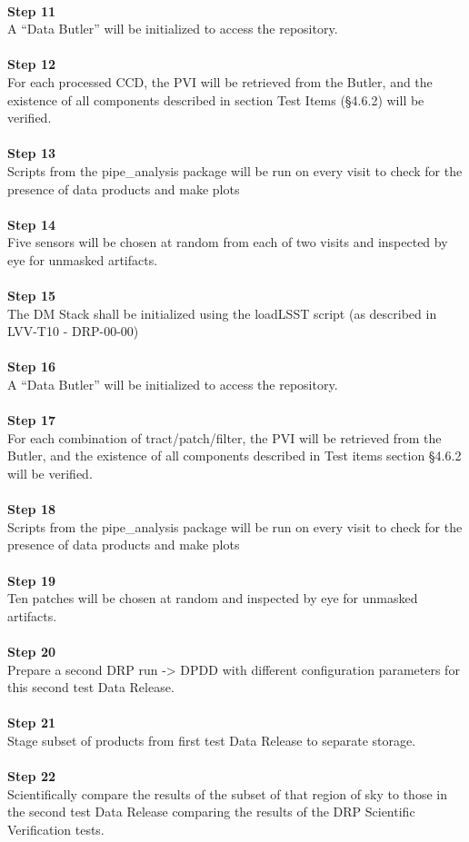 ~\\
\textbf{Step 11}\\
A ``Data Butler'' will be initialized to access the repository.\\
~\\
\textbf{Step 12}\\
For each processed CCD, the PVI will be retrieved from the Butler, and
the existence of all components described in section Test Items (§4.6.2)
will be verified.\\
~\\
\textbf{Step 13}\\
Scripts from the pipe\_analysis package will be run on every visit to
check for the presence of data products and make plots\\
~\\
\textbf{Step 14}\\
Five sensors will be chosen at random from each of two visits and
inspected by eye for unmasked artifacts.\\
~\\
\textbf{Step 15}\\
The DM Stack shall be initialized using the loadLSST script (as
described in LVV-T10 - DRP-00-00)\\
~\\
\textbf{Step 16}\\
A ``Data Butler'' will be initialized to access the repository.\\
~\\
\textbf{Step 17}\\
For each combination of tract/patch/filter, the PVI will be retrieved
from the Butler, and the existence of all components described in Test
items section §4.6.2 will be verified.\\
~\\
\textbf{Step 18}\\
Scripts from the pipe\_analysis package will be run on every visit to
check for the presence of data products and make plots\\
~\\
\textbf{Step 19}\\
Ten patches will be chosen at random and inspected by eye for unmasked
artifacts.\\
~\\
\textbf{Step 20}\\
Prepare a second DRP run -\textgreater{} DPDD with different
configuration parameters for this second test Data Release.\\
~\\
\textbf{Step 21}\\
Stage subset of products from first test Data Release to separate
storage.\\
~\\
\textbf{Step 22}\\
Scientifically compare the results of the subset of that region of sky
to those in the second test Data Release comparing the results of the
DRP Scientific Verification tests.\\
~\\

